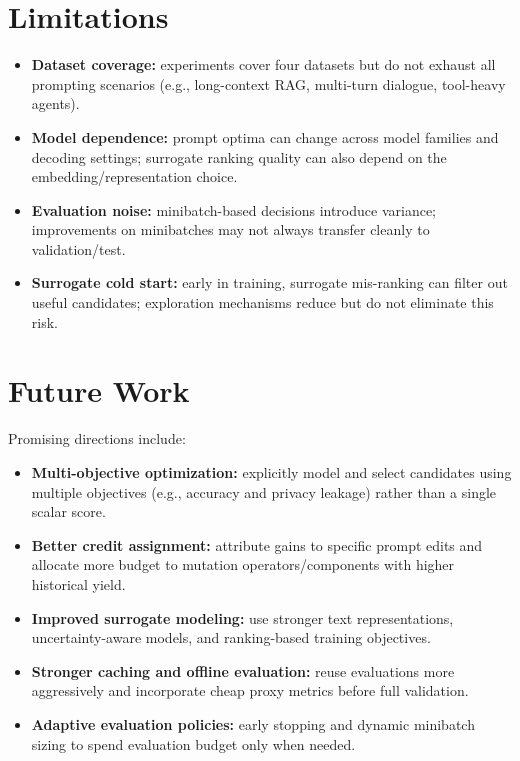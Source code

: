 \section{Limitations}
\begin{itemize}
    \item \textbf{Dataset coverage:} experiments cover four datasets but do not exhaust all prompting scenarios (e.g., long-context RAG, multi-turn dialogue, tool-heavy agents).
    \item \textbf{Model dependence:} prompt optima can change across model families and decoding settings; surrogate ranking quality can also depend on the embedding/representation choice.
    \item \textbf{Evaluation noise:} minibatch-based decisions introduce variance; improvements on minibatches may not always transfer cleanly to validation/test.
    \item \textbf{Surrogate cold start:} early in training, surrogate mis-ranking can filter out useful candidates; exploration mechanisms reduce but do not eliminate this risk.
\end{itemize}

\section{Future Work}
Promising directions include:
\begin{itemize}
    \item \textbf{Multi-objective optimization:} explicitly model and select candidates using multiple objectives (e.g., accuracy and privacy leakage) rather than a single scalar score.
    \item \textbf{Better credit assignment:} attribute gains to specific prompt edits and allocate more budget to mutation operators/components with higher historical yield.
    \item \textbf{Improved surrogate modeling:} use stronger text representations, uncertainty-aware models, and ranking-based training objectives.
    \item \textbf{Stronger caching and offline evaluation:} reuse evaluations more aggressively and incorporate cheap proxy metrics before full validation.
    \item \textbf{Adaptive evaluation policies:} early stopping and dynamic minibatch sizing to spend evaluation budget only when needed.
\end{itemize}